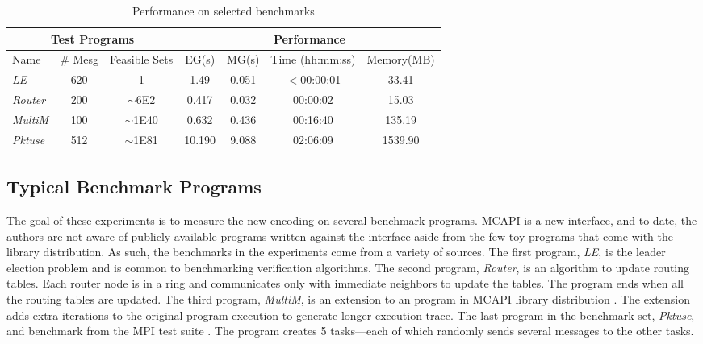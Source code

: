 \begin{table}
\begin{center}
\setlength{\tabcolsep}{2pt}
\scriptsize
\caption{Performance on selected benchmarks}
\begin{tabular}{|l|c|c|c|c|c|c|}
		\hline
         \multicolumn{3}{|c|}{Test Programs} & \multicolumn{4}{|c|}{Performance} \\ \hline
         Name & \# Mesg & Feasible Sets & EG(s) & MG(s) & Time (hh:mm:ss) & Memory(MB) \\ \hline
         \textit{LE} & 620 & 1 & 1.49 & 0.051 & $<$00:00:01 & 33.41  \\ %
         \textit{Router} & 200 & $\sim$6E2 & 0.417 & 0.032 & 00:00:02 & 15.03  \\ %
         \textit{MultiM} & 100 & $\sim$1E40 & 0.632 & 0.436 &  00:16:40 & 135.19  \\ %
         \textit{Pktuse} & 512 & $\sim$1E81 & 10.190 & 9.088 & 02:06:09 & 1539.90 \\ %
         \hline
		\end{tabular}
\end{center}
\label{table:second}
\end{table}

\subsection{Typical Benchmark Programs}
The goal of these experiments is to measure the new encoding on several benchmark programs. MCAPI is a new interface, and to date, the authors are not aware of publicly available programs written against the interface aside from the few toy programs that come with the library distribution. As such, the benchmarks in the experiments come from a variety of sources. The first program, \textit{LE}, is the leader election problem and is common to benchmarking verification algorithms. The second program, \textit{Router}, is an algorithm to update routing tables. Each router node is in a ring and communicates only with immediate neighbors to update the tables. The program ends when all the routing tables are updated. The third program, \textit{MultiM}, is an extension to an program in MCAPI library distribution . The extension adds extra iterations to the original program execution to generate longer execution trace. The last program in the benchmark set, \textit{Pktuse}, and benchmark from the MPI test suite \cite{mpptest_benchmark}. The program creates 5 tasks---each of which randomly sends several messages to the other tasks.

